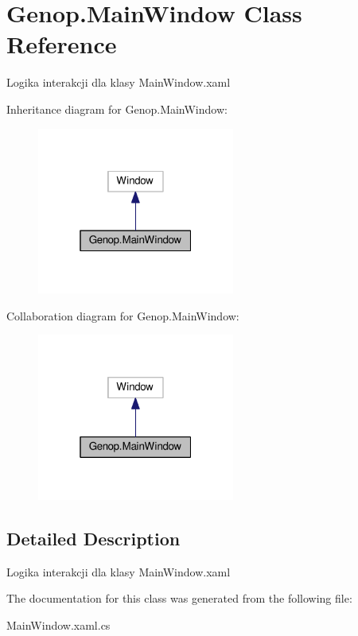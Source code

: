 \hypertarget{classGenop_1_1MainWindow}{}\section{Genop.\+Main\+Window Class Reference}
\label{classGenop_1_1MainWindow}


Logika interakcji dla klasy Main\+Window.\+xaml  




Inheritance diagram for Genop.\+Main\+Window\+:
\nopagebreak
\begin{figure}[H]
\begin{center}
\leavevmode
\includegraphics[width=184pt]{classGenop_1_1MainWindow__inherit__graph}
\end{center}
\end{figure}


Collaboration diagram for Genop.\+Main\+Window\+:
\nopagebreak
\begin{figure}[H]
\begin{center}
\leavevmode
\includegraphics[width=184pt]{classGenop_1_1MainWindow__coll__graph}
\end{center}
\end{figure}


\subsection{Detailed Description}
Logika interakcji dla klasy Main\+Window.\+xaml 



The documentation for this class was generated from the following file\+:\begin{DoxyCompactItemize}
\item 
Main\+Window.\+xaml.\+cs\end{DoxyCompactItemize}
